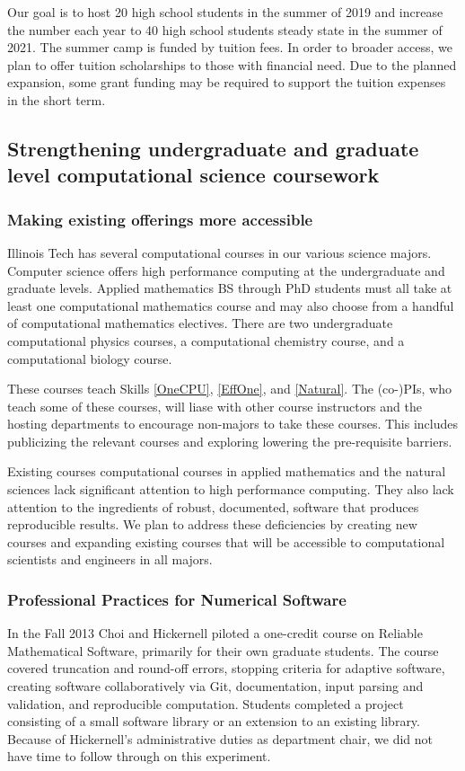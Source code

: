 \documentclass[11pt]{NSFamsart}
\begin{document}
Our goal is to host 20 high school students in the summer of 2019 and increase the number each year to 40 high school students steady state in the summer of 2021.  The summer camp is funded by tuition fees.  In order to broader access, we plan to offer tuition scholarships to those with financial need.  Due to the planned expansion, some grant funding may be required to support the tuition expenses in the short term.

\subsection{Strengthening undergraduate and graduate level computational science coursework} \label{Curr} 
\subsubsection{Making existing offerings more accessible} \label{CurrExist} Illinois Tech has several computational courses in our various science majors.  Computer science offers high performance computing at the undergraduate and graduate levels.  Applied mathematics BS through PhD students must all take at least one computational mathematics course and may also choose from a handful of computational mathematics electives. There are two undergraduate computational physics courses, a computational chemistry course, and a computational biology course.

These courses teach Skills \ref{OneCPU}, \ref{EffOne}, and \ref{Natural}.  The (co-)PIs, who teach some of these courses, will liase  with other course instructors and the hosting departments to encourage non-majors to take these courses.  This includes publicizing the relevant courses and exploring lowering the pre-requisite barriers.

Existing courses computational courses in applied mathematics and the natural sciences lack significant attention to high performance computing.  They also lack attention to the ingredients of robust, documented, software that produces reproducible results.  We plan to address these deficiencies by creating new courses and expanding existing courses that will be accessible to computational scientists and engineers in all majors.

\subsubsection{Professional Practices for Numerical Software} \label{RelSoft} In the Fall 2013 Choi and Hickernell piloted a one-credit course on Reliable Mathematical Software, primarily for their own graduate students.  The course covered truncation and round-off errors,
stopping criteria for adaptive software,
creating software collaboratively via Git, 
documentation,
input parsing and validation, and
reproducible computation.
Students completed a project consisting of a small software library or an extension to an existing library.  Because of Hickernell's administrative duties as department chair, we did not have time to follow through on this experiment.  
\end{document}
